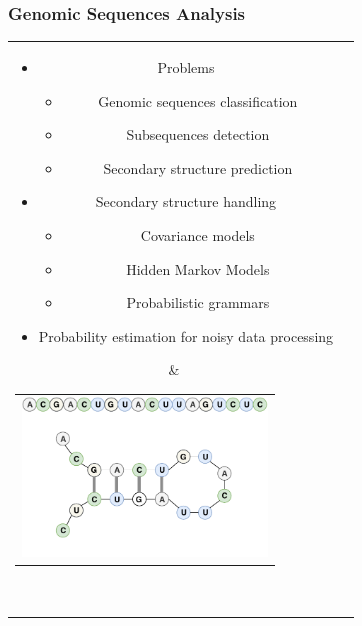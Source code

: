\documentclass[xcolor=table]{beamer}
\begin{document}
\begin{frame} \frametitle{Genomic Sequences Analysis}
\begin{tabular}{cl}  
    \parbox{0.44\linewidth}{
        \begin{itemize}
            \item Problems
            \begin{itemize}
                \item Genomic sequences classification
                \item Subsequences detection
                \item Secondary structure prediction
            \end{itemize}
            \item Secondary structure handling
            \begin{itemize}
                \item Covariance models
                \item Hidden Markov Models
                \item Probabilistic grammars
            \end{itemize}
            \item Probability estimation for noisy data processing
        \end{itemize}
    }
    & \begin{tabular}{l}
            \vspace{-0.8cm}
            \hspace{-0.8cm}
            \includegraphics[width=6.5cm]{pictures/molekula.pdf}
         \end{tabular}  \\
\end{tabular}
\end{frame}
\end{document}
